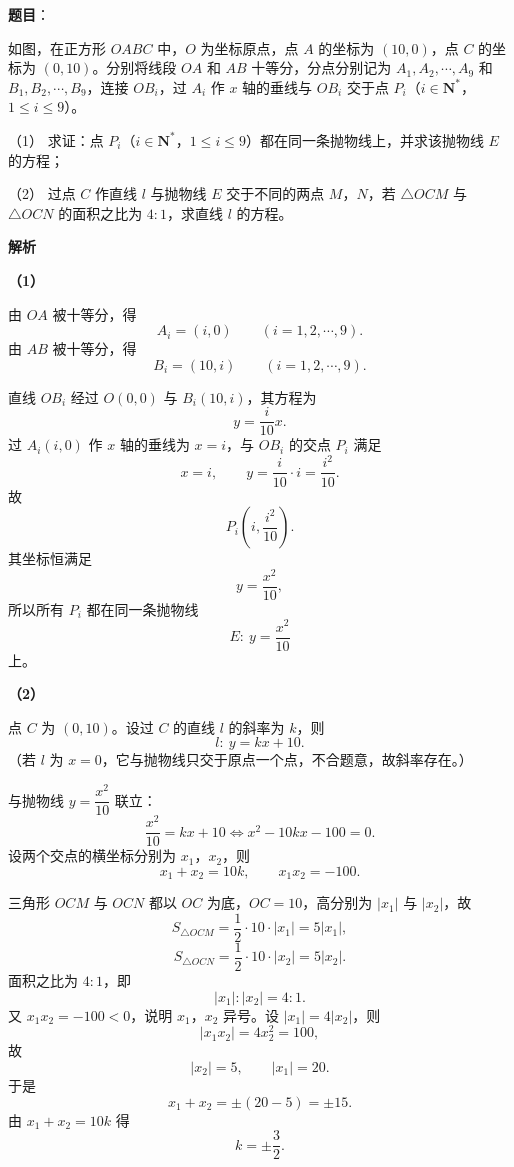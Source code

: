 \begin{answer}

\textbf{题目}：

如图，在正方形 $OABC$ 中，$O$ 为坐标原点，点 $A$ 的坐标为 $(10,0)$，点 $C$ 的坐标为 $(0,10)$。分别将线段 $OA$ 和 $AB$ 十等分，分点分别记为 $A_1,A_2,\cdots,A_9$ 和 $B_1,B_2,\cdots,B_9$，连接 $OB_i$，过 $A_i$ 作 $x$ 轴的垂线与 $OB_i$ 交于点 $P_i$（$i\in\mathbf N^*$，$1\leqslant i\leqslant9$）。

（1） 求证：点 $P_i$（$i\in\mathbf N^*$，$1\leqslant i\leqslant9$）都在同一条抛物线上，并求该抛物线 $E$ 的方程；

（2） 过点 $C$ 作直线 $l$ 与抛物线 $E$ 交于不同的两点 $M$，$N$，若 $\triangle OCM$ 与 $\triangle OCN$ 的面积之比为 $4:1$，求直线 $l$ 的方程。
\nopagebreak[4]
\begin{center}\end{center}
\nopagebreak[4]
\textbf{解析}

\textbf{（1）}

由 $OA$ 被十等分，得
\nopagebreak[4]
\[A_i=(i,0)\qquad(i=1,2,\cdots,9).\]
由 $AB$ 被十等分，得
\nopagebreak[4]
\[B_i=(10,i)\qquad(i=1,2,\cdots,9).\]

直线 $OB_i$ 经过 $O(0,0)$ 与 $B_i(10,i)$，其方程为
\nopagebreak[4]
\[y=\frac{i}{10}x.\]
过 $A_i(i,0)$ 作 $x$ 轴的垂线为 $x=i$，与 $OB_i$ 的交点 $P_i$ 满足
\nopagebreak[4]
\[x=i,\qquad y=\frac{i}{10}\cdot i=\frac{i^2}{10}.\]
故
\nopagebreak[4]
\[P_i\left(i,\frac{i^2}{10}\right).\]
其坐标恒满足
\nopagebreak[4]
\[y=\frac{x^2}{10},\]
所以所有 $P_i$ 都在同一条抛物线
\nopagebreak[4]
\[E:\ y=\frac{x^2}{10}\]
上。

\textbf{（2）}

点 $C$ 为 $(0,10)$。设过 $C$ 的直线 $l$ 的斜率为 $k$，则
\nopagebreak[4]
\[l:\ y=kx+10.\]
（若 $l$ 为 $x=0$，它与抛物线只交于原点一个点，不合题意，故斜率存在。）

与抛物线 $y=\dfrac{x^2}{10}$ 联立：
\nopagebreak[4]
\[\frac{x^2}{10}=kx+10
\Longleftrightarrow x^2-10kx-100=0.\]
设两个交点的横坐标分别为 $x_1$，$x_2$，则
\nopagebreak[4]
\[x_1+x_2=10k,\qquad x_1x_2=-100.\]

三角形 $OCM$ 与 $OCN$ 都以 $OC$ 为底，$OC=10$，高分别为 $|x_1|$ 与 $|x_2|$，故
\nopagebreak[4]
\[S_{\triangle OCM}=\frac12\cdot10\cdot|x_1|=5|x_1|,\]
\nopagebreak[4]
\[S_{\triangle OCN}=\frac12\cdot10\cdot|x_2|=5|x_2|.\]
面积之比为 $4:1$，即
\nopagebreak[4]
\[|x_1|:|x_2|=4:1.\]
又 $x_1x_2=-100<0$，说明 $x_1$，$x_2$ 异号。设 $|x_1|=4|x_2|$，则
\nopagebreak[4]
\[|x_1x_2|=4x_2^2=100,\]
故
\nopagebreak[4]
\[|x_2|=5,\qquad |x_1|=20.\]
于是
\nopagebreak[4]
\[x_1+x_2=\pm(20-5)=\pm15.\]
由 $x_1+x_2=10k$ 得
\nopagebreak[4]
\[k=\pm\frac32.\]


\end{answer}
